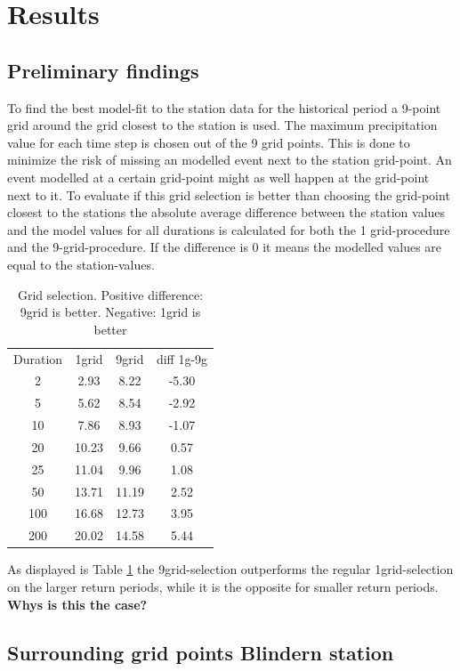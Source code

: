 \section{Results}
\label{sec:results}

\subsection{Preliminary findings}

To find the best model-fit to the station data for the historical period a 9-point grid around the grid closest to the station is used. The maximum precipitation value for each time step is chosen out of the 9 grid points. This is done to minimize the risk of missing an modelled event next to the station grid-point. An event modelled at a certain grid-point might as well happen at the grid-point next to it. To evaluate if this grid selection is better than choosing the grid-point closest to the stations the absolute average difference between the station values and the model values for all durations is calculated for both the 1 grid-procedure and the 9-grid-procedure. If the difference is 0 it means the modelled values are equal to the station-values.  

\begin{table}
\begin{tabular}{ c c c c }

Duration & 1grid & 9grid & diff 1g-9g \\
2 & 2.93 & 8.22 & -5.30 \\
5 & 5.62 & 8.54 & -2.92 \\
10 & 7.86 & 8.93 & -1.07 \\
20 & 10.23 & 9.66 & 0.57 \\
25 & 11.04 & 9.96 & 1.08 \\
50 & 13.71 & 11.19 & 2.52 \\
100 & 16.68 & 12.73 & 3.95 \\
200 & 20.02 & 14.58 & 5.44
\end{tabular}
    \label{grid}
\caption{Grid selection. Positive difference: 9grid is better. Negative: 1grid is better}
\end{table}

As displayed is Table \ref{grid} the 9grid-selection outperforms the regular 1grid-selection on the larger return periods, while it is the opposite for smaller return periods.
\textbf{Whys is this the case?}

\subsection{Surrounding grid points Blindern station}

